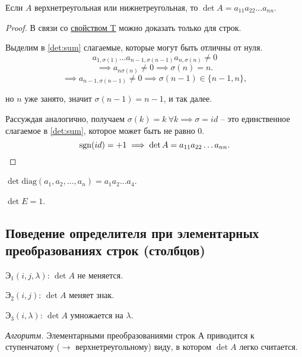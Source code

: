 \begin{description}[resume]
\item[Свойство 6\label{det:prop_6}]
    Если $A$ верхнетреугольная или нижнетреугольная, то $\det A = a_{11} a_{22} \dots a_{nn}$.

    \begin{proof}
        В связи со \hyperref[det:prop_t]{свойством T} можно доказать только для строк.

        Выделим в \eqref{det:sum} слагаемые, которые могут быть отличны от нуля.
        \begin{equation*}
            a_{1, \sigma(1)} \dots a_{n - 1, \sigma(n - 1)} a_{n, \sigma(n)} \neq 0
        \end{equation*}
        \begin{equation*}
            \implies a_{n\sigma(n)} \neq 0 \implies \sigma(n) = n
        .\end{equation*}
        \begin{equation*}
            \implies a_{n - 1, \sigma(n - 1)} \neq 0 \implies \sigma(n - 1) \in \{n - 1, n\},
        \end{equation*}

        но $n$ уже занято, значит $\sigma(n - 1) = n - 1$, и так далее.

        Рассуждая аналогично, получаем $\sigma(k) = k \ \forall k \implies \sigma = id$ -- это единственное слагаемое в \eqref{det:sum}, которое может быть не равно 0.
        \begin{equation*}
            \operatorname{\mathop{\mathrm{sgn}}}(id) = +1 \implies \det A = a_{11} a_{22} \dots a_{nn}
        .\end{equation*}
    \end{proof}

    \begin{corollary}
        $\det \text{diag}(a_1, a_2, \dots, a_n) = a_1 a_2 \dots a_4$.
    \end{corollary}

    \begin{corollary}
        $\det E = 1$.
    \end{corollary}
\end{description}


\subsection{Поведение определителя при элементарных преобразованиях строк (столбцов)}

$\text{Э}_1 (i, j, \lambda)$: $\det A$ не меняется.

$\text{Э}_2 (i, j)$: $\det A$ меняет знак.

$\text{Э}_3 (i, \lambda)$: $\det A$ умножается на $\lambda$.


\bigskip
\textit{Алгоритм.} Элементарными преобразованиями строк А приводится к ступенчатому ($\to$ верхнетреугольному) виду, в котором $\det A$ легко считается.

